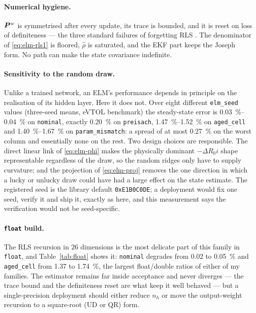 \paragraph{Numerical hygiene.}  $\bm{P}^w$ is symmetrised after every update, its trace is bounded,
and it is reset on loss of definiteness --- the three standard failures of forgetting RLS
\citep{ljung1999}.  The denominator of \cref{eq:elm-rls1} is floored, $\hat\rho$ is saturated, and
the EKF part keeps the Joseph form.  No path can make the state covariance indefinite.

\paragraph{Sensitivity to the random draw.}  Unlike a trained network, an ELM's performance depends
in principle on the realisation of its hidden layer.  Here it does not.  Over eight different
\texttt{elm\_seed} values (three-seed means, eVTOL benchmark) the steady-state error is
\SIrange{0.03}{0.04}{\percent} on \texttt{nominal}, exactly \SI{0.20}{\percent} on
\texttt{preisach}, \SIrange{1.47}{1.52}{\percent} on \texttt{aged\_cell} and
\SIrange{1.40}{1.67}{\percent} on \texttt{param\_mismatch}: a spread of at most \SI{0.27}{\percent}
on the worst column and essentially none on the rest.  Two design choices are responsible.  The
direct linear link of \cref{eq:elm-phi} makes the physically dominant $-\Delta R_0 i$ shape
representable regardless of the draw, so the random ridges only have to supply curvature; and the
projection of \cref{eq:elm-proj} removes the one direction in which a lucky or unlucky draw could
have had a large effect on the state estimate.  The registered seed is the library default
\texttt{0xE1B0C0DE}; a deployment would fix one seed, verify it and ship it, exactly as here, and
this measurement says the verification would not be seed-specific.

\paragraph{\texttt{float} build.}  The RLS recursion in $26$ dimensions is the most delicate part
of this family in \texttt{float}, and Table~\ref{tab:float} shows it: \texttt{nominal} degrades from
\SI{0.02}{} to \SI{0.05}{\percent} and \texttt{aged\_cell} from \SI{1.37}{} to \SI{1.74}{\percent},
the largest float/double ratios of either of my families.  The estimator remains far inside
acceptance and never diverges --- the trace bound and the definiteness reset are what keep it well
behaved --- but a single-precision deployment should either reduce $n_h$ or move the output-weight
recursion to a square-root (UD or QR) form.

